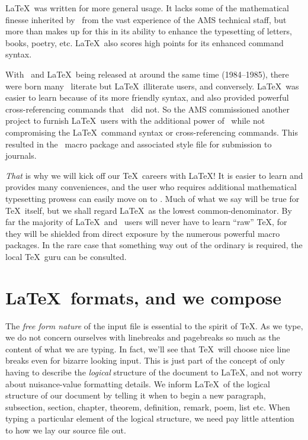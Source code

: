 \LaTeX\ was written for more general usage.  It lacks some of the
mathematical finesse inherited by \AmSTeX\ from the vast experience of the AMS
technical staff, but more than makes up for this in its ability to enhance
the typesetting of letters, books, poetry, etc.  \LaTeX\ also scores high
points for its enhanced command syntax.

With \AmSTeX\ and \LaTeX\ being released at around the same time (1984--1985),
there were born many \AmSTeX\ literate but \LaTeX\ illiterate users,
and conversely.  \LaTeX\ was easier to learn because of its more friendly
syntax, and also provided powerful cross-referencing commands that
\AmSTeX\ did not.  So the AMS commissioned another project to
furnish \LaTeX\ users with the additional power of \AmSTeX\
while not compromising the \LaTeX\ command syntax or
cross-referencing commands.  This resulted in the \AmSLaTeX\
macro package and associated style file for submission to journals.

{\em That\/} is why we will kick off our \TeX\ careers with \LaTeX!
It is easier to learn and provides many conveniences, and the user
who requires additional mathematical typesetting prowess can
easily move on to \AmSLaTeX.  Much of what we say will be true
for \TeX\ itself, but we shall regard \LaTeX\ as the lowest
common-denominator.  By far the majority of \LaTeX\ and
\AmSLaTeX\ users will never have to learn ``raw'' \TeX, for they will
be shielded from direct exposure by the numerous powerful macro packages.
In the rare case that something way out of the ordinary is required,
the local \TeX\ guru can be consulted.

\section{\LaTeX\ formats, and we compose}
The {\em free form nature\/} of the input file is essential to the
spirit of \TeX.  As we type, we do not concern ourselves with linebreaks
and pagebreaks so much as the content of what we are typing.  In fact,
we'll see that \TeX\ will choose nice line breaks even for bizarre looking
input.  This is just part of the concept of only having to describe the
{\em logical\/} structure of the document to \LaTeX, and not worry
about nuisance-value formatting details.  We inform \LaTeX\
of the logical structure of our document by telling it when to begin
a new paragraph, subsection, section, chapter, theorem, definition,
remark, poem, list etc.  When typing a particular element of the logical
structure, we need pay little attention to how we lay our source file out.

